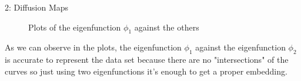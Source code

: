 \documentclass[10pt,a4paper]{article}
\begin{document}
\begin{task}{2: Diffusion Maps}
\begin{figure} [H]
\centering
\end{figure}

\begin{figure} [H]
\centering
    \caption{Plots of the eigenfunction \(\phi_1\) against the others}
    \label{plots}
\end{figure}

As we can observe in the plots, the eigenfunction \(\phi_1\) against the eigenfunction \(\phi_2\) is accurate to represent the data set because there are no "intersections" of the curves so just using two eigenfunctions it's enough to get a proper embedding. 

\bigskip
\end{task}
\end{document}
